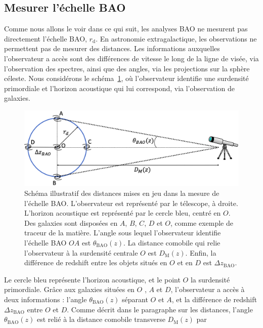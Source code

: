 \subsection{Mesurer l'échelle BAO}
\label{subsec:mesure_bao}
Comme nous allons le voir dans ce qui suit, les analyses BAO ne mesurent pas directement l'échelle BAO, $r_\mathrm{d}$. En astronomie extragalactique, les observations  ne permettent pas de mesurer des distances. Les informations auxquelles l'observateur a accès sont des différences de vitesse le long de la ligne de visée, via l'observation des spectres, ainsi que des angles, via les projections sur la sphère céleste.
Nous considérons le schéma~\ref{fig:bao_dessin}, où l'observateur identifie une surdensité primordiale et l'horizon acoustique qui lui correspond, via l'observation de galaxies.
\begin{figure}
  \centering
  \includegraphics[scale=0.40]{bao_dessin}
  \caption{Schéma illustratif des distances mises en jeu dans la mesure de l'échelle BAO. L'observateur est représenté par le télescope, à droite. L'horizon acoustique est représenté par le cercle bleu, centré en $O$. Des galaxies sont disposées en $A$, $B$, $C$, $D$ et $O$, comme exemple de traceur de la matière. L'angle sous lequel l'observateur identifie l'échelle BAO $OA$ est $\theta_{\mathrm{BAO}}(z)$. La distance comobile qui relie l'observateur à la surdensité centrale $O$ est $D_{\mathrm{M}}(z)$. Enfin, la différence de redshift entre les objets situés en $O$ et en $D$ est $\Delta z_{\mathrm{BAO}}$.}
  \label{fig:bao_dessin}
\end{figure}
Le cercle bleu représente l'horizon acoustique, et le point $O$ la surdensité primordiale. Grâce aux galaxies situées en $O$ , $A$  et $D$, l'observateur a accès à deux informations : l'angle $\theta_{\mathrm{BAO}}(z)$ séparant $O$ et $A$, et la différence de redshift $\Delta z_{\mathrm{BAO}}$ entre $O$ et $D$. Comme décrit dans le paragraphe sur les distances, l'angle $\theta_{\mathrm{BAO}}(z)$ est relié à la distance comobile transverse $D_{\mathrm{M}}(z)$ par
